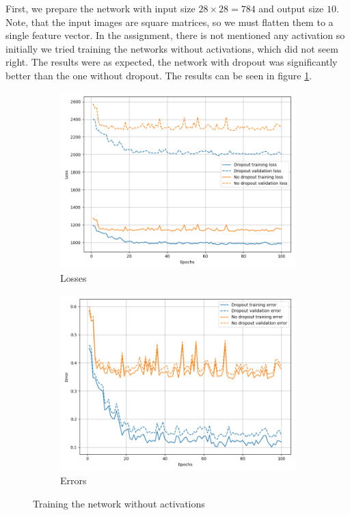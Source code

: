 \documentclass[a4paper,11pt]{article}
\begin{document}
First, we prepare the network with input size $28 \times 28 = 784$ and output size $10$.
Note, that the input images are square matrices, so we must flatten them to a single feature vector.
In the assignment, there is not mentioned any activation so initially we tried training the networks without activations, which did not seem right.
The results were as expected, the network with dropout was significantly better than the one without dropout.
The results can be seen in figure \ref{fig:mnist_no_act}.

\begin{figure}[ht]
    \centering
    \hfill
    \begin{subfigure}[b]{0.45\textwidth}
        \includegraphics[width=\textwidth]{../out/03_dropout_no_relu/loss.png}
        \caption{Losses}
    \end{subfigure}
    \hfill
    \begin{subfigure}[b]{0.45\textwidth}
        \includegraphics[width=\textwidth]{../out/03_dropout_no_relu/error.png}
        \caption{Errors}
    \end{subfigure}
    \hfill
    \caption{Training the network without activations}
    \label{fig:mnist_no_act}
\end{figure}
\end{document}
